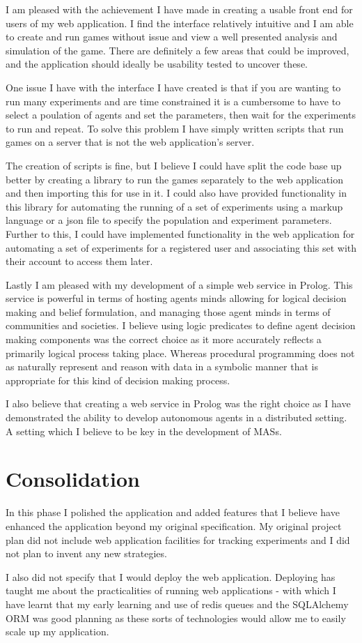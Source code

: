 \documentclass[]{final_report}
\begin{document}
I am pleased with the achievement I have made in creating a usable front end for users of my web application. I find the interface relatively intuitive and I am able to create and run games without issue and view a well presented analysis and simulation of the game. There are definitely a few areas that could be improved, and the application should ideally be usability tested to uncover these.\par 
One issue I have with the interface I have created is that if you are wanting to run many experiments and are time constrained it is a cumbersome to have to select a poulation of agents and set the parameters, then wait for the experiments to run and repeat. To solve this problem I have simply written scripts that run games on a server that is not the web application's server.\par 
The creation of scripts is fine, but I believe I could have split the code base up better by creating a library to run the games separately to the web application and then importing this for use in it. I could also have provided functionality in this library for automating the running of a set of experiments using a markup language or a json file to specify the population and experiment parameters. Further to this, I could have implemented functionality in the web application for automating a set of experiments for a registered user and associating this set with their account to access them later.\par 
Lastly I am pleased with my development of a simple web service in Prolog. This service is powerful in terms of hosting agents minds allowing for logical decision making and belief formulation, and managing those agent minds in terms of communities and societies. I believe using logic predicates to define agent decision making components was the correct choice as it more accurately reflects a primarily logical process taking place. Whereas procedural programming does not as naturally represent and reason with data in a symbolic manner that is appropriate for this kind of decision making process.\par 
I also believe that creating a web service in Prolog was the right choice as I have demonstrated the ability to develop autonomous agents in a distributed setting. A setting which I believe to be key in the development of MASs.

\section{Consolidation}
In this phase I polished the application and added features that I believe have enhanced the application beyond my original specification. My original project plan did not include web application facilities for tracking experiments and I did not plan to invent any new strategies.\par 
I also did not specify that I would deploy the web application. Deploying has taught me about the practicalities of running web applications - with which I have learnt that my early learning and use of redis queues and the SQLAlchemy ORM was good planning as these sorts of technologies would allow me to easily scale up my application.\par 
\end{document}

